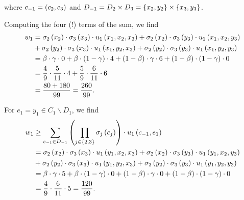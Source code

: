 \begin{enumerate} [label=\Alph*. ]
	      where $c_{-1} = \left(c_2, c_3\right)$ and $D_{-1} = D_{2} \times D_{3} = \left\{x_2, y_2\right\} \times \left\{x_3, y_3\right\}$.
	      	              
	      Computing the four (!) terms of the sum, we find
	      \begin{align*}
	      	w_1
	      	  & = \sigma_{2} \left(x_{2}\right) \cdot \sigma_{3} \left(x_{3}\right) \cdot u_{1} \left(x_1, x_2, x_3\right)  
	      	+  \sigma_{2} \left(x_{2}\right) \cdot \sigma_{3} \left(y_{3}\right) \cdot u_{1} \left(x_1, x_2, y_3\right) \\
	      	  & +  \sigma_{2} \left(y_{2}\right) \cdot \sigma_{3} \left(x_{3}\right) \cdot u_{1} \left(x_1, y_2, x_3\right) 
	      	+  \sigma_{2} \left(y_{2}\right) \cdot \sigma_{3} \left(y_{3}\right) \cdot u_{1} \left(x_1, y_2, y_3\right) \\
	      	  & = \beta \cdot \gamma \cdot 0                                                                    
	      	+  \beta \cdot \left(1 - \gamma\right) \cdot 4
	      	+  \left(1 - \beta\right) \cdot \gamma \cdot 6
	      	+  \left(1 - \beta\right) \cdot \left(1 - \gamma\right) \cdot 0 \\
	      	  & = \dfrac{4}{9} \cdot \dfrac{5}{11} \cdot 4                                                      
	      	+ \dfrac{5}{9} \cdot \dfrac{6}{11} \cdot 6 \\
	      	  & = \dfrac{80 + 180}{99} = \dfrac{260}{99}.                                                       
	      \end{align*}
	      	              
	      	              
	      	              
	      For $e_1 = y_1 \in C_1 \backslash D_{1}$, we find
	      \begin{align*}
	      	w_1
	      	  & \geq \sum_{c_{-1} \in D_{-1}} \left(\prod_{j \in \left\{2,3\right\}} \sigma_{j} \left(c_{j}\right) \right) \cdot u_{1} \left(c_{-1}, e_1\right) \\
	      	  & = \sigma_{2} \left(x_{2}\right) \cdot \sigma_{3} \left(x_{3}\right) \cdot u_{1} \left(y_1, x_2, x_3\right)                                 
	      	+  \sigma_{2} \left(x_{2}\right) \cdot \sigma_{3} \left(y_{3}\right) \cdot u_{1} \left(y_1, x_2, y_3\right) \\
	      	  & +  \sigma_{2} \left(y_{2}\right) \cdot \sigma_{3} \left(x_{3}\right) \cdot u_{1} \left(y_1, y_2, x_3\right)                                
	      	+  \sigma_{2} \left(y_{2}\right) \cdot \sigma_{3} \left(y_{3}\right) \cdot u_{1} \left(y_1, y_2, y_3\right) \\
	      	  & = \beta \cdot \gamma \cdot 5                                                                                                   
	      	+  \beta \cdot \left(1 - \gamma\right) \cdot 0
	      	+  \left(1 - \beta\right) \cdot \gamma \cdot 0
	      	+  \left(1 - \beta\right) \cdot \left(1 - \gamma\right) \cdot 0 \\
	      	  & = \dfrac{4}{9} \cdot \dfrac{6}{11} \cdot 5                                                                                     
	      	= \dfrac{120}{99}.
	      \end{align*}
	      	              

\end{enumerate}

